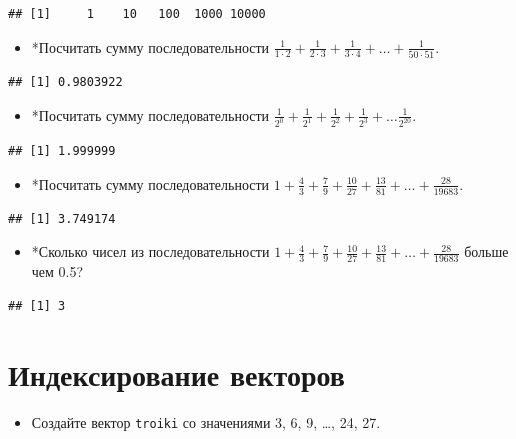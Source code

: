 \documentclass[]{book}
\providecommand{\tightlist}{%
  \setlength{\itemsep}{0pt}\setlength{\parskip}{0pt}}
\begin{document}
\begin{verbatim}
## [1]     1    10   100  1000 10000
\end{verbatim}

\begin{itemize}
\tightlist
\item
  *Посчитать сумму последовательности
  \(\frac{1}{1 \cdot 2}+\frac{1}{2 \cdot 3}+\frac{1}{3 \cdot 4}+\ldots+\frac{1}{50 \cdot 51}\).
\end{itemize}

\begin{verbatim}
## [1] 0.9803922
\end{verbatim}

\begin{itemize}
\tightlist
\item
  *Посчитать сумму последовательности
  \(\frac{1}{2^{0}}+\frac{1}{2^{1}}+\frac{1}{2^{2}}+\frac{1}{2^{3}}+\ldots \frac{1}{2^{20}}\).
\end{itemize}

\begin{verbatim}
## [1] 1.999999
\end{verbatim}

\begin{itemize}
\tightlist
\item
  *Посчитать сумму последовательности
  \(1+\frac{4}{3}+\frac{7}{9}+\frac{10}{27}+\frac{13}{81}+\ldots+\frac{28}{19683}\).
\end{itemize}

\begin{verbatim}
## [1] 3.749174
\end{verbatim}

\begin{itemize}
\tightlist
\item
  *Сколько чисел из последовательности
  \(1+\frac{4}{3}+\frac{7}{9}+\frac{10}{27}+\frac{13}{81}+\ldots+\frac{28}{19683}\)
  больше чем 0.5?
\end{itemize}

\begin{verbatim}
## [1] 3
\end{verbatim}

\section{Индексирование векторов}\label{task_vec_ind}

\begin{itemize}
\tightlist
\item
  Создайте вектор \texttt{troiki} со значениями 3, 6, 9, \ldots{}, 24,
  27.
\end{itemize}
\end{document}
